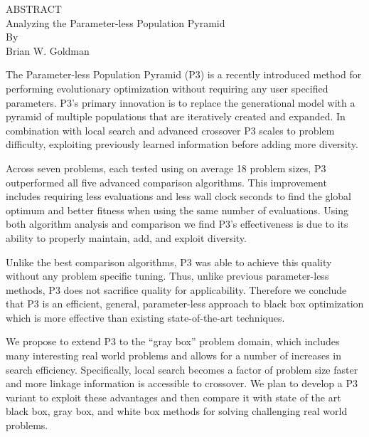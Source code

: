 \thispagestyle{empty} \setcounter{page}{2}
\begin{doublespace}
\begin{centering}
ABSTRACT\\ %
Analyzing the Parameter-less Population Pyramid \\ %
By \\ %
Brian W. Goldman\\ %
\end{centering}

The Parameter-less Population Pyramid (P3) is a recently introduced method for performing
evolutionary optimization without requiring any user specified parameters.
P3's primary innovation is to replace the generational model with a pyramid of
multiple populations that are iteratively created and expanded. In combination
with local search and advanced crossover P3 scales to problem difficulty, exploiting
previously learned information before adding more diversity.

Across seven problems, each tested using on average 18 problem sizes, P3 outperformed
all five advanced comparison algorithms. This improvement includes requiring less evaluations
and less wall clock seconds to find the global optimum and better fitness when using
the same number of evaluations. Using both algorithm analysis and comparison we find P3's
effectiveness is due to its ability to properly maintain, add, and exploit diversity.

Unlike the best comparison algorithms, P3 was able to achieve this quality without any
problem specific tuning. Thus, unlike previous parameter-less methods, P3 does not
sacrifice quality for applicability. Therefore we conclude that
P3 is an efficient, general, parameter-less approach to black box
optimization which is more effective than existing state-of-the-art techniques.

We propose to extend P3 to the ``gray box'' problem domain, which includes many
interesting real world problems and allows for a number of increases in search efficiency.
Specifically, local search becomes a factor of problem size faster and more linkage information
is accessible to crossover. We plan to develop a P3 variant to exploit these
advantages and then compare it with state of the art black box, gray box, and
white box methods for solving challenging real world problems.
\end{doublespace}
\newpage
